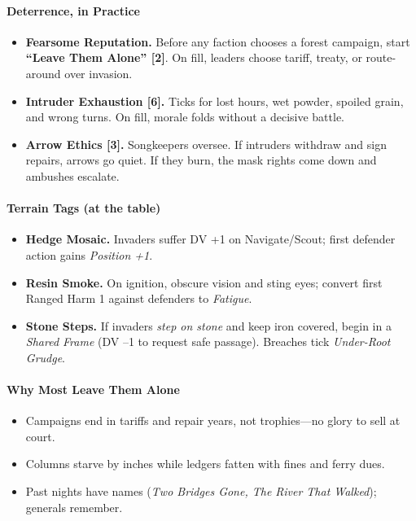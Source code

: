 \documentclass[11pt]{article}
\begin{document}
\paragraph{Deterrence, in Practice}
\begin{itemize}[leftmargin=*]
  \item \textbf{Fearsome Reputation.} Before any faction chooses a forest campaign, start \textbf{``Leave Them Alone'' [2]}. On fill, leaders choose tariff, treaty, or route-around over invasion.
  \item \textbf{Intruder Exhaustion [6].} Ticks for lost hours, wet powder, spoiled grain, and wrong turns. On fill, morale folds without a decisive battle.
  \item \textbf{Arrow Ethics [3].} Songkeepers oversee. If intruders withdraw and sign repairs, arrows go quiet. If they burn, the mask rights come down and ambushes escalate.
\end{itemize}

\paragraph{Terrain Tags (at the table)}
\begin{itemize}[leftmargin=*]
  \item \textbf{Hedge Mosaic.} Invaders suffer DV +1 on Navigate/Scout; first defender action gains \emph{Position +1}.
  \item \textbf{Resin Smoke.} On ignition, obscure vision and sting eyes; convert first Ranged Harm 1 against defenders to \emph{Fatigue}.
  \item \textbf{Stone Steps.} If invaders \emph{step on stone} and keep iron covered, begin in a \emph{Shared Frame} (DV --1 to request safe passage). Breaches tick \emph{Under-Root Grudge}.
\end{itemize}

\paragraph{Why Most Leave Them Alone}
\begin{itemize}[leftmargin=*]
  \item Campaigns end in tariffs and repair years, not trophies---no glory to sell at court.
  \item Columns starve by inches while ledgers fatten with fines and ferry dues.
  \item Past nights have names (\emph{Two Bridges Gone, The River That Walked}); generals remember.
\end{itemize}
\end{document}
